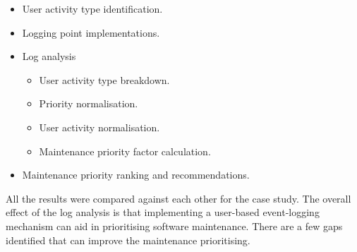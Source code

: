 \begin{itemize}
	\item User activity type identification.
	\item Logging point implementations.
	\item Log analysis
		\begin{itemize}
			\item User activity type breakdown.
			\item Priority normalisation.
			\item User activity normalisation.
			\item Maintenance priority factor calculation.
		\end{itemize}
	\item Maintenance priority ranking and recommendations. 
\end{itemize}

All the results were compared against each other for the case study. The overall effect of the log analysis is that implementing a user-based event-logging mechanism can aid in prioritising software maintenance. There are a few gaps identified that can improve the maintenance prioritising.
